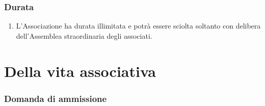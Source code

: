\documentclass{djtsasddoc}
\begin{document}
	\section{Durata}
	\begin{enumerate}
		\item L'Associazione ha durata illimitata e potrà essere sciolta soltanto con delibera dell'Assemblea straordinaria degli associati.
	\end{enumerate}
	
	\part{Della vita associativa}
	\section{Domanda di ammissione}
\end{document}
